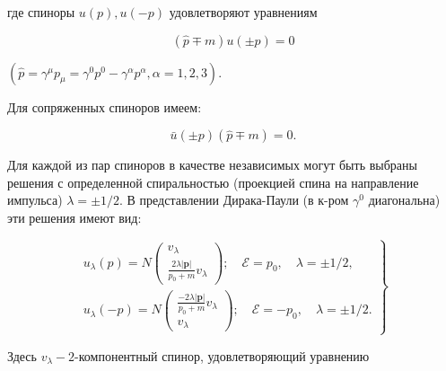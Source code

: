 \documentclass[10pt]{article}
\begin{document}
где спиноры $u(p), u(-p)$ удовлетворяют уравнениям



\[

(\hat{p} \mp m) u( \pm p)=0

\]



$\left(\hat{p}=\gamma^{\mu} p_{\mu}=\gamma^{0} p^{0}-\gamma^{\alpha} p^{\alpha}, \alpha=1,2,3\right)$.



Для сопряженных спиноров имеем:



\[

\bar{u}( \pm p)(\hat{p} \mp m)=0 .

\]



Для каждой из пар спиноров в качестве независимых могут быть выбраны решения с определенной спиральностью (проекцией спина на направление импульса) $\lambda= \pm 1 / 2$. В представлении Дирака-Паули (в к-ром $\gamma^{0}$ диагональна) эти решения имеют вид:



\[

\left.\begin{array}{c}

u_{\lambda}(p)=N\left(\begin{array}{l}

v_{\lambda} \\

\frac{2 \lambda|\boldsymbol{p}|}{p_{0}+m} v_{\lambda}

\end{array}\right) ; \quad \mathscr{E}=p_{0}, \quad \lambda= \pm 1 / 2, \\

u_{\lambda}(-p)=N\left(\begin{array}{l}

\frac{-2 \lambda|\boldsymbol{p}|}{p_{0}+m} v_{\lambda} \\

v_{\lambda}

\end{array}\right) ; \quad \mathscr{E}=-p_{0}, \quad \lambda= \pm 1 / 2 .

\end{array}\right\}

\]



Здесь $v_{\lambda}-2$-компонентный спинор, удовлетворяющий уравнению
\end{document}
